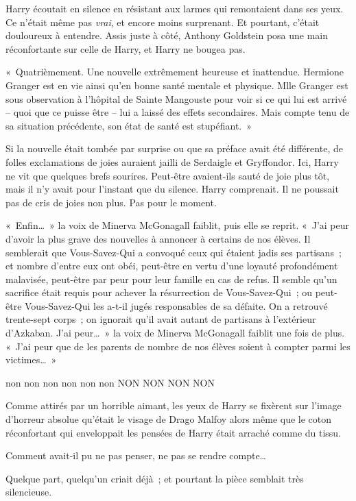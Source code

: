 Harry écoutait en silence en résistant aux larmes qui remontaient dans ses yeux. Ce n'était même pas \emph{vrai}, et encore moins surprenant. Et pourtant, c'était douloureux à entendre. Assis juste à côté, Anthony Goldstein posa une main réconfortante sur celle de Harry, et Harry ne bougea pas.

«~Quatrièmement. Une nouvelle extrêmement heureuse et inattendue. Hermione Granger est en vie ainsi qu'en bonne santé mentale et physique. Mlle Granger est sous observation à l'hôpital de Sainte Mangouste pour voir si ce qui lui est arrivé -- quoi que ce puisse être -- lui a laissé des effets secondaires. Mais compte tenu de sa situation précédente, son état de santé est stupéfiant.~»

Si la nouvelle était tombée par surprise ou que sa préface avait été différente, de folles exclamations de joies auraient jailli de Serdaigle et Gryffondor. Ici, Harry ne vit que quelques brefs sourires. Peut-être avaient-ils sauté de joie plus tôt, mais il n'y avait pour l'instant que du silence. Harry comprenait. Il ne poussait pas de cris de joies non plus. Pas pour le moment.

«~Enfin…~» la voix de Minerva McGonagall faiblit, puis elle se reprit. «~J'ai peur d'avoir la plus grave des nouvelles à annoncer à certains de nos élèves. Il semblerait que Vous-Savez-Qui a convoqué ceux qui étaient jadis ses partisans~; et nombre d'entre eux ont obéi, peut-être en vertu d'une loyauté profondément malavisée, peut-être par peur pour leur famille en cas de refus. Il semble qu'un sacrifice était requis pour achever la résurrection de Vous-Savez-Qui~; ou peut-être Vous-Savez-Qui les a-t-il jugés responsables de sa défaite. On a retrouvé trente-sept corps~; on ignorait qu'il avait autant de partisans à l'extérieur d'Azkaban. J'ai peur…~» la voix de Minerva McGonagall faiblit une fois de plus. «~J'ai peur que de les parents de nombre de nos élèves soient à compter parmi les victimes…~»

non non non non non non NON NON NON NON

Comme attirés par un horrible aimant, les yeux de Harry se fixèrent sur l'image d'horreur absolue qu'était le visage de Drago Malfoy alors même que le coton réconfortant qui enveloppait les pensées de Harry était arraché comme du tissu.

Comment avait-il pu ne pas penser, ne pas se rendre compte…

Quelque part, quelqu'un criait déjà~; et pourtant la pièce semblait très silencieuse.


